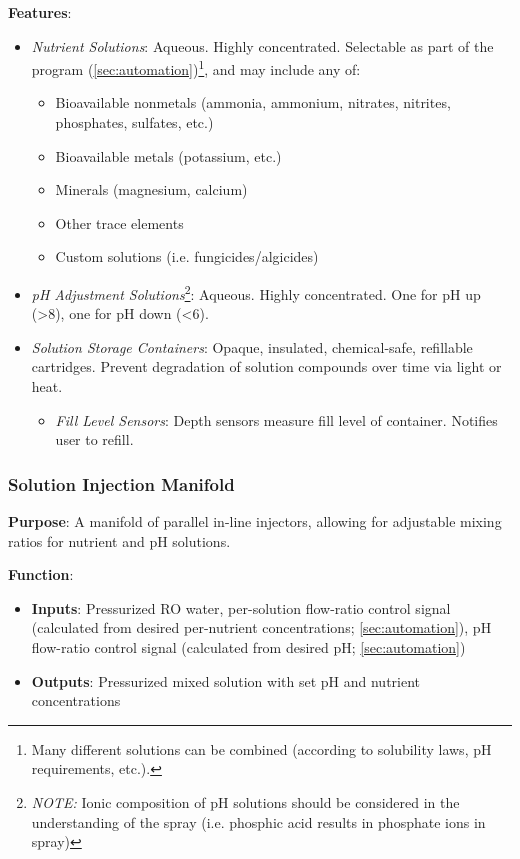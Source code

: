 \documentclass{report}
\begin{document}
\textbf{Features}:
\begin{itemize}
    \item \textit{Nutrient Solutions}: Aqueous. Highly concentrated. Selectable as part of the program (\ref{sec:automation})\footnote{Many different solutions can be combined (according to solubility laws, pH requirements, etc.).}, and may include any of:
    \begin{itemize}
        \item Bioavailable nonmetals (ammonia, ammonium, nitrates, nitrites, phosphates, sulfates, etc.)
        \item Bioavailable metals (potassium, etc.)
        \item Minerals (magnesium, calcium)
        \item Other trace elements
        \item Custom solutions (i.e. fungicides/algicides)
    \end{itemize} 
    \item \textit{pH Adjustment Solutions}\footnote{\textit{NOTE:} Ionic composition of pH solutions should be considered in the understanding of the spray (i.e. phosphic acid results in phosphate ions in spray)}: Aqueous. Highly concentrated. One for pH up (>8), one for pH down (<6).
    \item \textit{Solution Storage Containers}: Opaque, insulated, chemical-safe, refillable cartridges. Prevent degradation of solution compounds over time via light or heat.
    \begin{itemize}
        \item \textit{Fill Level Sensors}: Depth sensors measure fill level of container. Notifies user to refill.
    \end{itemize}
\end{itemize}

\vspace{.5cm}

\subsubsection{Solution Injection Manifold}
\label{sec:manifold}

\textbf{Purpose}: A manifold of parallel in-line injectors, allowing for adjustable mixing ratios for nutrient and pH solutions.

\textbf{Function}:
\begin{itemize}
    \item \textbf{Inputs}: Pressurized RO water, per-solution flow-ratio control signal (calculated from desired per-nutrient concentrations; \ref{sec:automation}), pH flow-ratio control signal (calculated from desired pH; \ref{sec:automation})
    \item \textbf{Outputs}: Pressurized mixed solution with set pH and nutrient concentrations
\end{itemize}
\end{document}
